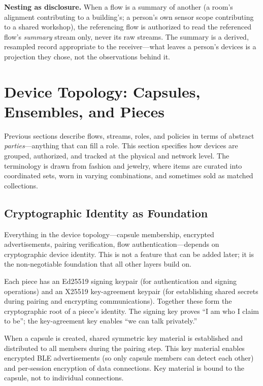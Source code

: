\documentclass[11pt, letterpaper]{article}
\begin{document}
\textbf{Nesting as disclosure.} When a flow is a summary of another (a room's
alignment contributing to a building's; a person's own sensor scope contributing to a
shared workshop), the referencing flow is authorized to read the referenced flow's
\emph{summary} stream only, never its raw streams. The summary is a derived,
resampled record appropriate to the receiver---what leaves a person's devices is a
projection they chose, not the observations behind it.


\newpage
\section{Device Topology: Capsules, Ensembles, and Pieces}
\label{sec:topology}

Previous sections describe flows, streams, roles, and policies in terms of abstract
\emph{parties}---anything that can fill a role. This section specifies how devices are
grouped, authorized, and tracked at the physical and network level. The terminology is
drawn from fashion and jewelry, where items are curated into coordinated sets, worn in
varying combinations, and sometimes sold as matched collections.

\subsection{Cryptographic Identity as Foundation}

Everything in the device topology---capsule membership, encrypted advertisements,
pairing verification, flow authentication---depends on cryptographic device identity.
This is not a feature that can be added later; it is the non-negotiable foundation that
all other layers build on.

Each piece has an Ed25519 signing keypair (for authentication and signing operations)
and an X25519 key-agreement keypair (for establishing shared secrets during pairing
and encrypting communications). Together these form the cryptographic root of a piece's
identity. The signing key proves ``I am who I claim to be''; the key-agreement key
enables ``we can talk privately.''

When a capsule is created, shared symmetric key material is established and distributed
to all members during the pairing step. This key material enables encrypted BLE
advertisements (so only capsule members can detect each other) and per-session encryption
of data connections. Key material is bound to the capsule, not to individual connections.
\end{document}

